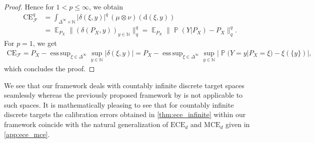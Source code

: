 \documentclass{article}
\DeclareMathOperator{\Prob}{\mathbb{P}}
\DeclareMathOperator{\Exp}{\mathbb{E}}
\DeclareMathOperator*{\esssup}{ess\,sup}
\begin{document}
\begin{proof}
    Hence for $1 < p \leq \infty$, we obtain
    \begin{equation*}
        \begin{split}
            \mathrm{CE}_{\mathcal{F}}^q &= \int_{\Delta^\infty \times \mathbb{N}} |\delta(\xi, y)|^{q} \,(\mu \otimes \nu)(\mathrm{d}(\xi, y)) \\
            &= \Exp_{P_X} \|(\delta(P_X, y))_{y \in \mathbb{N}}\|_q^q = \Exp_{P_X} \|\Prob(Y |P_X) - P_X\|_q^q.
        \end{split}
    \end{equation*}
    For $p = 1$, we get
    \begin{equation*}
        \begin{split}
            \mathrm{CE}_{\mathcal{F}} = P_X-\esssup_{\xi \in \Delta^{\infty}} \sup_{y \in \mathbb{N}} |\delta(\xi, y)| = P_X-\esssup_{\xi \in \Delta^{\infty}} \sup_{y \in \mathbb{N}} |\Prob(Y=y|P_X=\xi) - \xi(\{y\})|,
        \end{split}
    \end{equation*}
    which concludes the proof.
\end{proof}

We see that our framework deals with countably infinite discrete target spaces seamlessly whereas the previously
proposed framework by \citet{Widmann2019} is not applicable to such spaces. It is mathematically pleasing to see
that for countably infinite discrete targets the calibration errors obtained in \cref{thm:ece_infinite} within
our framework coincide with the natural generalization of $\mathrm{ECE}_d$ and $\mathrm{MCE}_d$ given in
\cref{app:ece_mce}.
\end{document}
